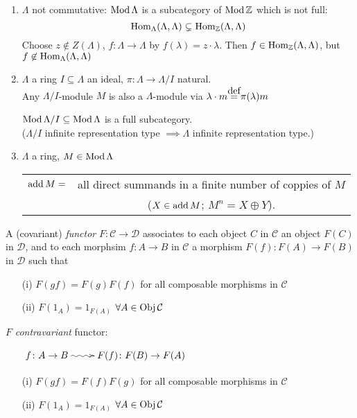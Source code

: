 \begin{exam}
\begin{enumerate}
\item $\Lambda$ not commutative: $\operatorname{Mod} \Lambda$ is a subcategory of $\operatorname{Mod}\mathbb{Z}$ which is not full: \[\operatorname{Hom}_\Lambda(\Lambda, \Lambda) \subsetneq \operatorname{Hom}_\mathbb{Z}(\Lambda, \Lambda)\]
Choose $z \not\in Z(\Lambda)$, $f\colon  \Lambda \to \Lambda$ by $f(\lambda) = z\cdot \lambda$. Then $f \in \operatorname{Hom}_\mathbb{Z}(\Lambda, \Lambda)$, but $f \not\in \operatorname{Hom}_\Lambda(\Lambda,\Lambda)$ 

\item $\Lambda$ a ring $I \subseteq \Lambda$ an ideal, $\pi \colon  \Lambda \to \Lambda/I$ natural.\\
Any $\Lambda/I$-module $M$ is also a $\Lambda$-module via $\lambda \cdot m \stackrel{\mathclap{\normalfont\mbox{def}}}{=} \pi(\lambda)m$
\begin{exer}
$\operatorname{Mod} \Lambda/I \subseteq \operatorname{Mod} \Lambda$ is a full subcategory.\\ ($\Lambda/I$ infinite representation type $\implies \Lambda$ infinite representation type.)
\end{exer}

\item $\Lambda$ a ring, $M \in \operatorname{Mod}\Lambda$\\
\begin{tabular}{cc}
$\operatorname{add} M = $ &all direct summands in a finite number of coppies of $M$\\&($X \in \operatorname{add} M$; $M^n = X \oplus Y$).
\end{tabular}
\end{enumerate}
\end{exam}

\begin{defin}
A (covariant) \emph{functor} $F\colon  \mathcal{C} \to \mathcal{D}$ associates to each object $C$ in $\mathcal{C}$ an object $F(C)$ in $\mathcal{D}$, and to each morphsim $f\colon A\to B$ in $\mathcal{C}$ a morphism $F(f)\colon F(A)\to F(B)$ in $\mathcal{D}$ such that
\begin{enumerate}
\item[(i)] $F(gf) = F(g)F(f)$ for all composable morphisms in $\mathcal{C}$
\item[(ii)] $F(1_A) = 1_{F(A)}$ $\forall A \in \operatorname{Obj} \mathcal{C}$
\end{enumerate}
$F$ \emph{contravariant} functor:
\begin{enumerate}
\item[] $\xymatrix{f\colon A\to B \ar@{~>}[r] & F(f)\colon  F(B) \to F(A)}$
\item[(i)] $F(gf) = F(f)F(g)$ for all composable morphisms in $\mathcal{C}$
\item[(ii)] $F(1_A) = 1_{F(A)}$ $\forall A \in \operatorname{Obj} \mathcal{C}$
\end{enumerate}
\end{defin}

